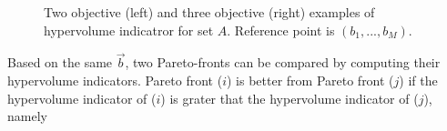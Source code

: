\begin{figure}[h!]
\begin{minipage}[b]{0.5\linewidth}
 \centering
\end{minipage}
\begin{minipage}[b]{0.5\linewidth}
 \centering
\end{minipage}
\caption{Two objective (left) and three objective (right) examples of hypervolume indicatror for set $A$. Reference point is $(b_1,...,b_M)$.}
\label{hyperV}
\end{figure}

Based on the same $\vec{b}$, two Pareto-fronts can be compared by computing their hypervolume indicators. Pareto front ($i$) is better from Pareto front ($j$) if the hypervolume indicator of ($i$) is grater that the hypervolume indicator of ($j$), namely 

